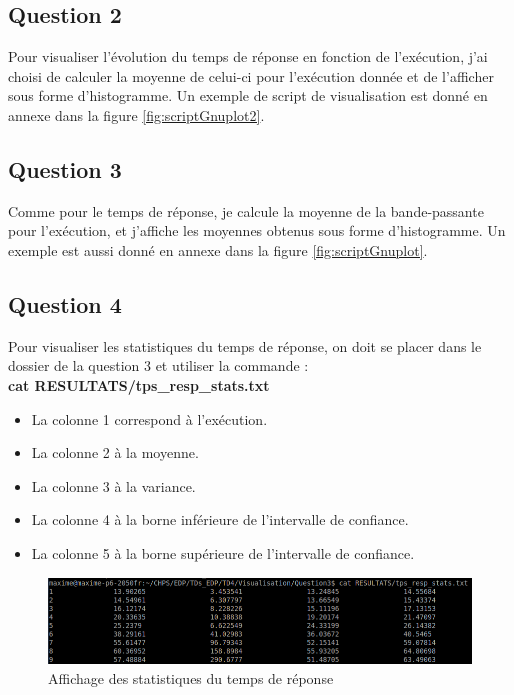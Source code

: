 \documentclass[a4paper]{article}
\begin{document}
\FloatBarrier


\subsection{Question 2}

Pour visualiser l'évolution du temps de réponse en fonction de l'exécution, j'ai choisi de calculer la moyenne de celui-ci pour l'exécution donnée et de l'afficher sous forme d'histogramme. Un exemple de script de visualisation est donné en annexe dans la figure \ref{fig:scriptGnuplot2}.


\subsection{Question 3}

Comme pour le temps de réponse, je calcule la moyenne de la bande-passante pour l'exécution, et j'affiche les moyennes obtenus sous forme d'histogramme.
Un exemple est aussi donné en annexe dans la figure \ref{fig:scriptGnuplot}.

\subsection{Question 4}

Pour visualiser les statistiques du temps de réponse, on doit se placer dans le dossier de la question 3 et utiliser la commande : \\
\textbf{cat RESULTATS/tps\_resp\_stats.txt}

\begin{itemize}
\item La colonne 1 correspond à l'exécution.
\item La colonne 2 à la moyenne.
\item La colonne 3 à la variance.
\item La colonne 4 à la borne inférieure de l'intervalle de confiance.
\item La colonne 5 à la borne supérieure de l'intervalle de confiance.
\end{itemize}

\begin{figure}[h]
	\begin{center}
		\includegraphics[scale=0.55]{SCREEN/stats.png}
	\end{center}
   	\caption{Affichage des statistiques du temps de réponse}
	\label{fig:quantiles}
\end{figure}
\end{document}
